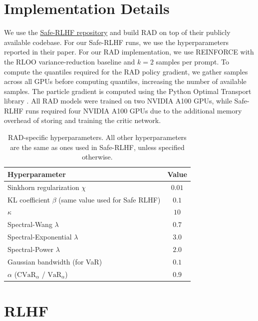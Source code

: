 \section{Implementation Details}
\label{supp:implementation-details}

We use the \href{https://github.com/PKU-Alignment/safe-rlhf}{Safe-RLHF repository} \citep{dai2023safe} and build RAD on top of their publicly available codebase. For our Safe-RLHF runs, we use the hyperparameters 
reported in their paper. For our RAD implementation, we use REINFORCE \citep{williams1992simple} with the RLOO variance-reduction baseline \citep{Kool2019Buy4R} and $k=2$ samples per prompt. To compute the quantiles required for the RAD policy gradient, we gather samples 
across all GPUs before computing quantiles, increasing the number of available samples. The particle gradient is computed using the Python Optimal Transport library \citep{flamary2021pot}. All RAD models were 
trained on two NVIDIA A100 GPUs, while Safe-RLHF runs required four NVIDIA A100 GPUs due to the additional memory overhead of storing and training the critic network.

\begin{table}[h]
\centering
\begin{tabular}{lc}
\toprule
Hyperparameter & Value \\
\midrule
Sinkhorn regularization $\chi$ & $0.01$ \\
KL coefficient $\beta$ (same value used for Safe RLHF) & $0.1$ \\
$\kappa$ & $10$ \\
Spectral-Wang $\lambda$ & $0.7$ \\
Spectral-Exponential $\lambda$  & $3.0$ \\
Spectral-Power $\lambda$ & $2.0$ \\
Gaussian bandwidth (for VaR) & $0.1$ \\
$\alpha$ ($\textrm{CVaR}_{\alpha}$ / $\textrm{VaR}_{\alpha}$) & $0.9$ \\
\bottomrule
\end{tabular}
\caption{RAD-specific hyperparameters. All other hyperparameters are the same as ones used in Safe-RLHF, unless specified otherwise.}
\label{tab:hyperparams}
\end{table}

\section{RLHF}
\label{supp:RLHF}


